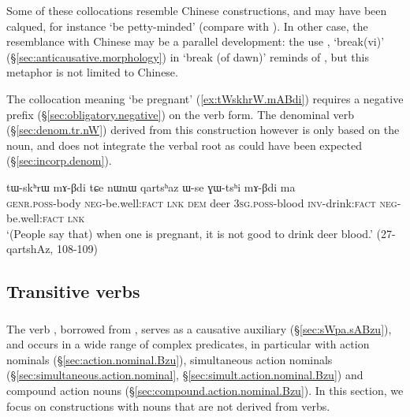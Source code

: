 Some of these collocations resemble Chinese constructions, and may have been calqued, for instance  `be petty-minded' (compare with ). In other case, the resemblance with Chinese may be a parallel development: the use , `break(vi)' (§\ref{sec:anticausative.morphology}) in  `break (of dawn)' reminds of , but this metaphor is not limited to Chinese.

The collocation meaning  `be pregnant' (\ref{ex:tWskhrW.mABdi}) requires a negative prefix (§\ref{sec:obligatory.negative}) on the verb form. The denominal verb   (§\ref{sec:denom.tr.nW}) derived from this construction however is only based on the noun, and does not integrate the verbal root as could have been expected (§\ref{sec:incorp.denom}).

 \begin{exe}
\ex \label{ex:tWskhrW.mABdi}
\gll tɯ-skʰrɯ mɤ-βdi tɕe nɯnɯ qartsʰaz ɯ-se ɣɯ-tsʰi mɤ-βdi ma \\
\textsc{genr}.\textsc{poss}-body \textsc{neg}-be.well:\textsc{fact} \textsc{lnk} \textsc{dem} deer \textsc{3sg}.\textsc{poss}-blood \textsc{inv}-drink:\textsc{fact} \textsc{neg}-be.well:\textsc{fact} \textsc{lnk} \\
\glt `(People say that) when one is pregnant, it is not good to drink deer blood.' (27-qartshAz, 108-109)
\end{exe}


 
\subsection{Transitive verbs}  \label{sec:tr.light.verbs}

\subsubsection{ } \label{sec:Bzu.lv}
The verb , borrowed from , serves as a causative auxiliary (§\ref{sec:sWpa.sABzu}), and occurs in a wide range of complex predicates, in particular with action nominals (§\ref{sec:action.nominal.Bzu}), simultaneous action nominals (§\ref{sec:simultaneous.action.nominal}, §\ref{sec:simult.action.nominal.Bzu}) and compound action nouns (§\ref{sec:compound.action.nominal.Bzu}). In this section, we focus on constructions with nouns that are not derived from verbs.
  
